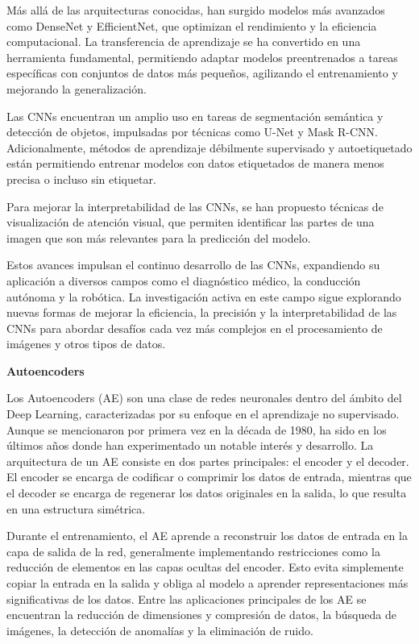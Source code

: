 \documentclass[
  a4paper,
  DIV=11,
  numbers=noendperiod]{scrreprt}
\begin{document}
Más allá de las arquitecturas conocidas, han surgido modelos más
avanzados como DenseNet y EfficientNet, que optimizan el rendimiento y
la eficiencia computacional. La transferencia de aprendizaje se ha
convertido en una herramienta fundamental, permitiendo adaptar modelos
preentrenados a tareas específicas con conjuntos de datos más pequeños,
agilizando el entrenamiento y mejorando la generalización.

Las CNNs encuentran un amplio uso en tareas de segmentación semántica y
detección de objetos, impulsadas por técnicas como U-Net y Mask R-CNN.
Adicionalmente, métodos de aprendizaje débilmente supervisado y
autoetiquetado están permitiendo entrenar modelos con datos etiquetados
de manera menos precisa o incluso sin etiquetar.

Para mejorar la interpretabilidad de las CNNs, se han propuesto técnicas
de visualización de atención visual, que permiten identificar las partes
de una imagen que son más relevantes para la predicción del modelo.

Estos avances impulsan el continuo desarrollo de las CNNs, expandiendo
su aplicación a diversos campos como el diagnóstico médico, la
conducción autónoma y la robótica. La investigación activa en este campo
sigue explorando nuevas formas de mejorar la eficiencia, la precisión y
la interpretabilidad de las CNNs para abordar desafíos cada vez más
complejos en el procesamiento de imágenes y otros tipos de datos.

\textbf{Autoencoders}

Los Autoencoders (AE) son una clase de redes neuronales dentro del
ámbito del Deep Learning, caracterizadas por su enfoque en el
aprendizaje no supervisado. Aunque se mencionaron por primera vez en la
década de 1980, ha sido en los últimos años donde han experimentado un
notable interés y desarrollo. La arquitectura de un AE consiste en dos
partes principales: el encoder y el decoder. El encoder se encarga de
codificar o comprimir los datos de entrada, mientras que el decoder se
encarga de regenerar los datos originales en la salida, lo que resulta
en una estructura simétrica.

Durante el entrenamiento, el AE aprende a reconstruir los datos de
entrada en la capa de salida de la red, generalmente implementando
restricciones como la reducción de elementos en las capas ocultas del
encoder. Esto evita simplemente copiar la entrada en la salida y obliga
al modelo a aprender representaciones más significativas de los datos.
Entre las aplicaciones principales de los AE se encuentran la reducción
de dimensiones y compresión de datos, la búsqueda de imágenes, la
detección de anomalías y la eliminación de ruido.
\end{document}

